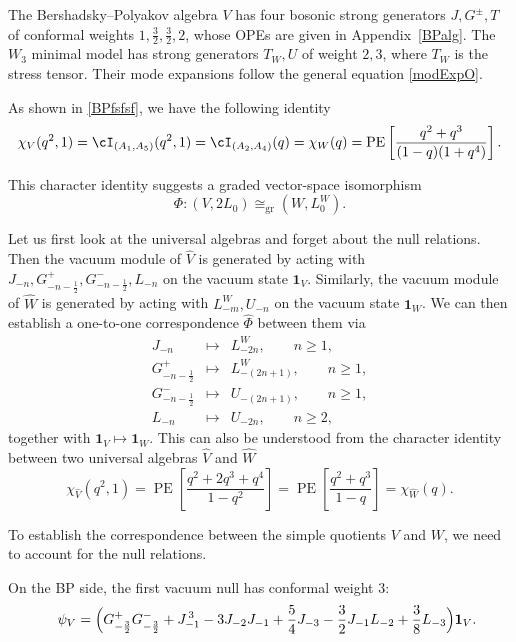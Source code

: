 \documentclass[a4paper,11pt]{article}
\theoremstyle{definition}
\theoremstyle{definition}
\theoremstyle{remark}
\newcommand{\be}{\begin{equation}}
\newcommand{\ee}{\end{equation}}
\newcommand{\beqn}{\begin{eqnarray}}
\newcommand{\eeqn}{\end{eqnarray}}
\begin{document}
The Bershadsky--Polyakov  algebra $V$ has four bosonic strong generators  $ J,G^\pm,T$ of  conformal weights $ 1,\frac32,\frac32,2$, whose   OPEs      are given in  Appendix~\ref{BPalg}. The $W_3 $ minimal model has strong generators $T_W,U$ of weight $2,3$, where $T_W$ is the stress tensor. Their mode expansions follow the general equation \eqref{modExpO}.

As shown in \eqref{BPfsfsf}, we have the following identity
\be
\chi_V(q^2,1)= {\cI}_{(A_1,A_5)}(q^2,1)= {\cI}_{(A_2,A_4)}(q)=\chi_W(q)
= \mathrm{PE} \left[\frac{q^2+q^3}{(1 - q) (1 + q^4)} \right].
\ee


 

 

 
 This character identity suggests a graded vector-space isomorphism
\be\label{VWFDfsd}
\Phi:(V,2L_0)\cong_{\mathrm{gr}}(W,L^W_0).
\ee
 
 
Let us first look at the universal algebras and forget about the null relations. Then the vacuum module   of $\widehat V$ is generated by 
acting with $J_{-n},G^+_{-n-\frac12},G^-_{-n-\frac12},L_{-n}$ on the vacuum state $\bm 1_V$. Similarly,  the vacuum module  of $\widehat W$ is generated by 
acting with $L^W_{-m},U_{-n}$ on the vacuum state $\bm 1_W$.  We can then establish a one-to-one correspondence $\widehat \Phi$ between them via
\beqn
J_{-n} &\longmapsto& L^W_{-2n},\qquad n\ge1,
\nonumber\\
G^+_{-n-\frac12} &\longmapsto& L^W_{-(2n+1)},\qquad n\ge1,
\nonumber\\
G^-_{-n-\frac12} &\longmapsto& U_{-(2n+1)},\qquad n\ge1,
\nonumber\\
L_{-n} &\longmapsto& U_{-2n},\qquad n\ge2,
\label{Phimap}
\eeqn
 together with $\bm 1_V \mapsto \bm 1_W$. 
   This can also be understood from the character identity  between   two universal algebras $\widehat V$ and $\widehat W$
\be
\chi_{ \widehat V}(q^2,1)=\operatorname{PE}\!\left[
\frac{q^2+2q^3+q^4}{1-q^2}
\right] =
\operatorname{PE}\!\left[
\frac{q^2+q^3}{1-q}
\right]= \chi _{\widehat W}(q).
\ee
 

To establish the   correspondence between   the simple  quotients $V$ and $W$, we need to account for the    null relations. 

On the BP side, the first   vacuum null has conformal weight $ 3$:
%
\beqn
&& \psi_V=\Bigl( G^+_{-\frac32}G^-_{-\frac32}
+J_{-1}^{\,3}
-3J_{-2}J_{-1}
+\frac54J_{-3} 
 -\frac32J_{-1}L_{-2}
+\frac38L_{-3}
\Bigr)\mathbf1_V.
\label{NullVs}
\eeqn
 
\end{document}
